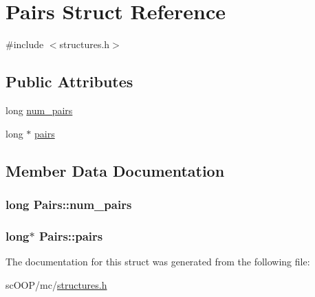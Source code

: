 \hypertarget{struct_pairs}{\section{Pairs Struct Reference}
\label{struct_pairs}
}


{\ttfamily \#include $<$structures.\+h$>$}

\subsection*{Public Attributes}
\begin{DoxyCompactItemize}
\item 
long \hyperlink{struct_pairs_ac0aae24afd86d0b54ca67fd82be6f2d9}{num\+\_\+pairs}
\item 
long $\ast$ \hyperlink{struct_pairs_adafa21cd6611e29948789a8d979317b4}{pairs}
\end{DoxyCompactItemize}


\subsection{Member Data Documentation}
\hypertarget{struct_pairs_ac0aae24afd86d0b54ca67fd82be6f2d9}{
\subsubsection[{num\+\_\+pairs}]{\setlength{\rightskip}{0pt plus 5cm}long Pairs\+::num\+\_\+pairs}}\label{struct_pairs_ac0aae24afd86d0b54ca67fd82be6f2d9}
\hypertarget{struct_pairs_adafa21cd6611e29948789a8d979317b4}{
\subsubsection[{pairs}]{\setlength{\rightskip}{0pt plus 5cm}long$\ast$ Pairs\+::pairs}}\label{struct_pairs_adafa21cd6611e29948789a8d979317b4}


The documentation for this struct was generated from the following file\+:\begin{DoxyCompactItemize}
\item 
sc\+O\+O\+P/mc/\hyperlink{structures_8h}{structures.\+h}\end{DoxyCompactItemize}
